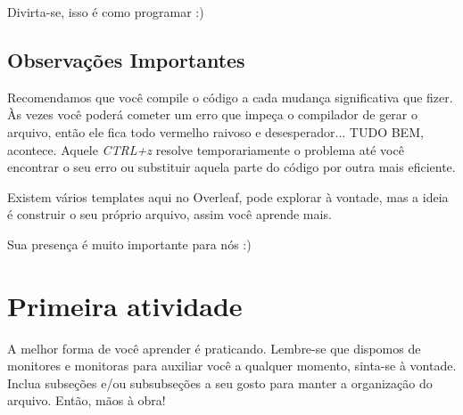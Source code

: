\documentclass{article}
\begin{document}
Divirta-se, isso é como programar :)

\subsection{Observações Importantes}

Recomendamos que você compile o código a cada mudança significativa que fizer. Às vezes você poderá cometer um erro que impeça o compilador de gerar o arquivo, então ele fica todo vermelho raivoso e desesperador... TUDO BEM, acontece. Aquele \textit{CTRL+z} resolve temporariamente o problema até você encontrar o seu erro ou substituir aquela parte do código por outra mais eficiente.

Existem vários templates aqui no Overleaf, pode explorar à vontade, mas a ideia é construir o seu próprio arquivo, assim você aprende mais.

Sua presença é muito importante para nós :)

\newpage

\section{Primeira atividade}
A melhor forma de você aprender é praticando. Lembre-se que dispomos de monitores e monitoras para auxiliar você a qualquer momento, sinta-se à vontade. Inclua subseções e/ou subsubseções a seu gosto para manter a organização do arquivo. Então, mãos à obra!
\end{document}
